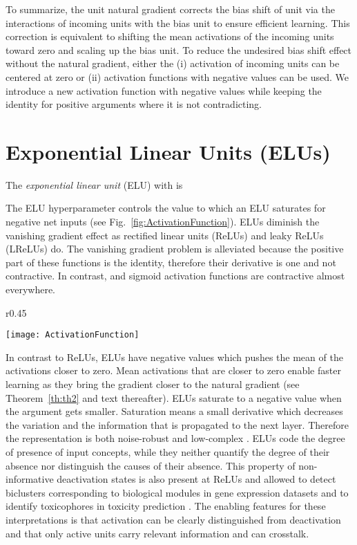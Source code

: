 \documentclass{article}
\begin{document}
To summarize,
the unit natural gradient corrects the bias shift of unit 
via the interactions of incoming units with the bias unit
to ensure efficient learning.
This correction is equivalent to shifting the mean activations
of the incoming units toward zero and scaling up the bias unit.
To reduce the undesired bias shift effect without the natural gradient,
either the
(i) activation of incoming units can be
centered at zero
or (ii) activation functions with negative values can be used.
We introduce a new activation function with negative values while
keeping the identity for positive arguments where it is not contradicting.


\section{Exponential Linear Units (ELUs)}
\label{sec:elu}



The {\em exponential linear unit} (ELU) with  is

The ELU hyperparameter  controls the value to
which an ELU saturates for negative net inputs (see Fig.~\ref{fig:ActivationFunction}).
ELUs diminish the vanishing gradient effect
as rectified linear units (ReLUs) and leaky ReLUs
(LReLUs) do.
The vanishing gradient problem is alleviated because
the positive part of these functions is the identity,
therefore their derivative is one and not contractive.
In contrast,  and sigmoid activation functions are contractive
almost everywhere.

\begin{wrapfigure}{r}{0.45\textwidth}
\vspace*{-10pt}
\begin{center}
\texttt{[image: ActivationFunction]}
\end{center}
\caption{The rectified linear unit (ReLU), the leaky ReLU (LReLU, ), the shifted ReLUs (SReLUs),
and the exponential linear unit (ELU, ). \label{fig:ActivationFunction}}
\vspace*{-5pt}
\end{wrapfigure}
In contrast to ReLUs, ELUs have negative values which
pushes the mean of the activations closer to zero.
Mean activations that are closer to zero enable faster learning as
they bring the gradient closer to the natural gradient (see
Theorem~\ref{th:th2} and text thereafter).
ELUs saturate to a negative value when the argument gets smaller.
Saturation means a small derivative
which decreases the variation and the information that is
propagated to the next layer. Therefore the representation
is both noise-robust and low-complex \citep{Hochreiter:99nc}.
ELUs code the degree of presence of input concepts,
while they neither quantify the degree of their absence nor distinguish
the causes of their absence.
This property of non-informative deactivation states is also present at ReLUs
and allowed to detect biclusters corresponding to
biological modules in gene expression datasets \citep{Clevert:15nips} and
to identify toxicophores in toxicity prediction \citep{Unterthiner:15,Mayr:15}.
The enabling features for these interpretations
is that activation can be clearly distinguished from deactivation
and that only active units carry relevant information and can crosstalk.
\end{document}
